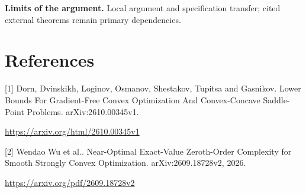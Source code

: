 \documentclass[10pt,a4paper]{article}
\begin{document}
\textbf{Limits of the argument.} Local argument and specification transfer; cited external theorems remain primary dependencies.

\section{References}
[1] Dorn, Dvinskikh, Loginov, Osmanov, Shestakov, Tupitsa and Gasnikov. Lower Bounds For Gradient-Free Convex Optimization And Convex-Concave Saddle-Point Problems. arXiv:2610.00345v1.

\url{https://arxiv.org/html/2610.00345v1}

[2] Wendao Wu et al.. Near-Optimal Exact-Value Zeroth-Order Complexity for Smooth Strongly Convex Optimization. arXiv:2609.18728v2, 2026.

\url{https://arxiv.org/pdf/2609.18728v2}
\end{document}
